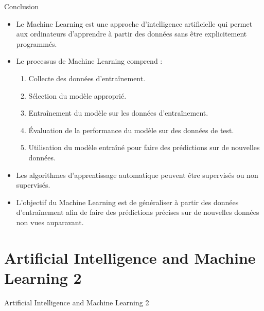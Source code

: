 \documentclass{beamer}
\begin{document}
\begin{frame}{Conclusion}
	\begin{itemize}
		\item Le Machine Learning est une approche d'intelligence artificielle qui permet aux ordinateurs d'apprendre à partir des données sans être explicitement programmés.
		\item Le processus de Machine Learning comprend :
		\begin{enumerate}
			\item Collecte des données d'entraînement.
			\item Sélection du modèle approprié.
			\item Entraînement du modèle sur les données d'entraînement.
			\item Évaluation de la performance du modèle sur des données de test.
			\item Utilisation du modèle entraîné pour faire des prédictions sur de nouvelles données.
		\end{enumerate}
		\item Les algorithmes d'apprentissage automatique peuvent être supervisés ou non supervisés.
		\item L'objectif du Machine Learning est de généraliser à partir des données d'entraînement afin de faire des prédictions précises sur de nouvelles données non vues auparavant.
	\end{itemize}
\end{frame}



\section{Artificial Intelligence and Machine Learning 2}

{
\begin{frame}{Artificial Intelligence and Machine Learning 2}
\end{frame}

}
\end{document}
